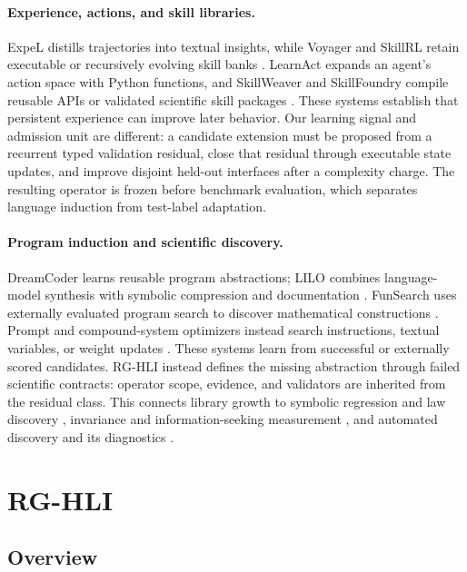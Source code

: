 \documentclass[letterpaper]{article}
\newcommand{\methodshort}{\textsc{RG-HLI}\xspace}
\begin{document}
\paragraph{Experience, actions, and skill libraries.}
ExpeL distills trajectories into textual insights, while Voyager and SkillRL
retain executable or recursively evolving skill banks
\citep{expel,voyager,skillrl}.
LearnAct expands an agent's action space with Python functions, and SkillWeaver
and SkillFoundry compile reusable APIs or validated scientific skill packages
\citep{learnact,skillweaver,skillfoundry}. These systems establish that
persistent experience can improve later behavior. Our learning signal and
admission unit are different: a candidate extension must be proposed from a
recurrent typed validation residual, close that residual through executable
state updates, and improve disjoint held-out interfaces after a complexity
charge. The resulting operator is frozen before benchmark evaluation, which
separates language induction from test-label adaptation.

\paragraph{Program induction and scientific discovery.}
DreamCoder learns reusable program abstractions; LILO combines language-model
synthesis with symbolic compression and documentation
\citep{dreamcoder,lilo}. FunSearch uses externally evaluated program search to
discover mathematical constructions \citep{funsearch,alphaevolve}. Prompt and
compound-system optimizers instead search instructions, textual variables, or
weight updates \citep{ape,dspy,promptbreeder,textgrad,seal}. These systems
learn from successful or externally scored candidates.
\methodshort instead defines the missing abstraction through failed scientific
contracts: operator scope, evidence, and validators are inherited from the
residual class. This connects library growth to symbolic regression and law
discovery \citep{aifeynman,newtonbench}, invariance and
information-seeking measurement \citep{pearl,invariant,bed}, and automated
discovery and its diagnostics
\citep{aiscientist,aiscientistnature,autobench,autodiscovery}.

\section{\methodshort}
\label{sec:rghli_method}

\subsection{Overview}
\end{document}
